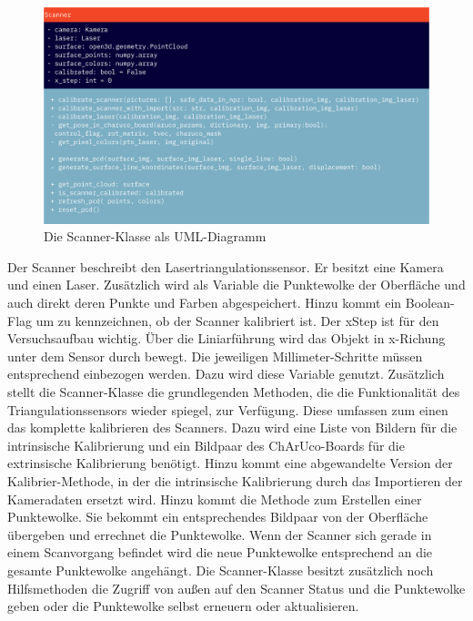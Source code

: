 		\begin{figure}[h]
			\centering
			\includegraphics[width=0.85\linewidth]{img/hauptteil/software/Scanner_UML.png}
			\caption{Die Scanner-Klasse als UML-Diagramm}
			\label{fig:scanner_uml}
		\end{figure}
		Der Scanner beschreibt den Lasertriangulationssensor. Er besitzt eine Kamera und einen Laser. Zusätzlich wird als Variable die Punktewolke der Oberfläche und auch direkt deren Punkte und Farben abgespeichert. Hinzu kommt ein Boolean-Flag um zu kennzeichnen, ob der Scanner kalibriert ist. Der xStep ist für den Versuchsaufbau wichtig. Über die Liniarführung wird das Objekt in x-Richung unter dem Sensor durch bewegt. Die jeweiligen Millimeter-Schritte müssen entsprechend einbezogen werden. Dazu wird diese Variable genutzt. \newline
		Zusätzlich stellt die Scanner-Klasse die grundlegenden Methoden, die die Funktionalität des Triangulationssensors wieder spiegel, zur Verfügung. Diese umfassen zum einen das komplette kalibrieren des Scanners. Dazu wird eine Liste von Bildern für die intrinsische Kalibrierung und ein Bildpaar des ChArUco-Boards für die extrinsische Kalibrierung benötigt. Hinzu kommt eine abgewandelte Version der Kalibrier-Methode, in der die intrinsische Kalibrierung durch das Importieren der Kameradaten ersetzt wird. Hinzu kommt die Methode zum Erstellen einer Punktewolke. Sie bekommt ein entsprechendes Bildpaar von der Oberfläche übergeben und errechnet die Punktewolke. Wenn der Scanner sich gerade in einem Scanvorgang befindet wird die neue Punktewolke entsprechend an die gesamte Punktewolke angehängt. Die Scanner-Klasse besitzt zusätzlich noch Hilfsmethoden die Zugriff von außen auf den Scanner Status und die Punktewolke geben oder die Punktewolke selbst erneuern oder aktualisieren.
		
